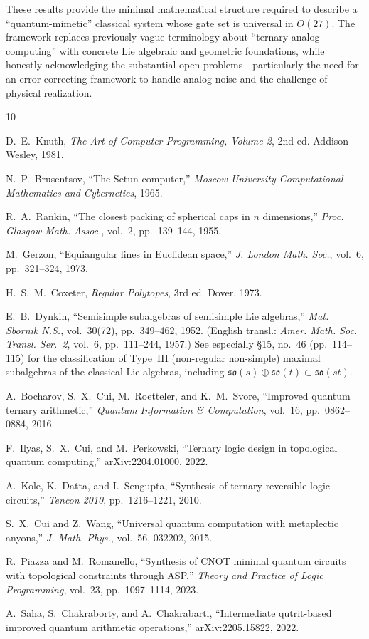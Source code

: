 \documentclass[12pt,a4paper]{article}
\begin{document}
These results provide the minimal mathematical structure required to
describe a ``quantum-mimetic'' classical system whose gate set is
universal in $O(27)$. The framework replaces previously vague
terminology about ``ternary analog computing'' with concrete Lie
algebraic and geometric foundations, while honestly acknowledging the
substantial open problems---particularly the need for an error-correcting
framework to handle analog noise and the challenge of physical
realization.

\begin{thebibliography}{10}

D.~E.~Knuth, \emph{The Art of Computer Programming, Volume 2},
2nd ed. Addison-Wesley, 1981.

N.~P.~Brusentsov, ``The Setun computer,''
\emph{Moscow University Computational Mathematics and Cybernetics}, 1965.

R.~A.~Rankin, ``The closest packing of spherical caps in $n$ dimensions,''
\emph{Proc. Glasgow Math. Assoc.}, vol.~2, pp.~139--144, 1955.

M.~Gerzon, ``Equiangular lines in Euclidean space,''
\emph{J. London Math. Soc.}, vol.~6, pp.~321--324, 1973.

H.~S.~M.~Coxeter, \emph{Regular Polytopes}, 3rd ed. Dover, 1973.

E.~B.~Dynkin, ``Semisimple subalgebras of semisimple Lie algebras,''
\emph{Mat. Sbornik N.S.}, vol.~30(72), pp.~349--462, 1952.
(English transl.: \emph{Amer. Math. Soc. Transl. Ser.~2}, vol.~6,
pp.~111--244, 1957.) See especially \S15, no.~46 (pp.~114--115)
for the classification of Type~III (non-regular non-simple) maximal
subalgebras of the classical Lie algebras, including
$\mathfrak{so}(s) \oplus \mathfrak{so}(t) \subset \mathfrak{so}(st)$.

A.~Bocharov, S.~X.~Cui, M.~Roetteler, and K.~M.~Svore, ``Improved
quantum ternary arithmetic,''
\emph{Quantum Information \& Computation}, vol.~16, pp.~0862--0884, 2016.

F.~Ilyas, S.~X.~Cui, and M.~Perkowski, ``Ternary logic design in
topological quantum computing,''
arXiv:2204.01000, 2022.

A.~Kole, K.~Datta, and I.~Sengupta, ``Synthesis of ternary reversible
logic circuits,''
\emph{Tencon 2010}, pp.~1216--1221, 2010.

S.~X.~Cui and Z.~Wang, ``Universal quantum computation with metaplectic
anyons,''
\emph{J. Math. Phys.}, vol.~56, 032202, 2015.

R.~Piazza and M.~Romanello, ``Synthesis of CNOT minimal quantum circuits
with topological constraints through ASP,''
\emph{Theory and Practice of Logic Programming}, vol.~23, pp.~1097--1114, 2023.

A.~Saha, S.~Chakraborty, and A.~Chakrabarti, ``Intermediate qutrit-based
improved quantum arithmetic operations,''
arXiv:2205.15822, 2022.

\end{thebibliography}
\end{document}
